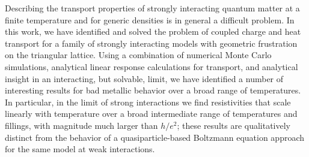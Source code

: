 \documentclass[aps,prx,onecolumn,amsmath,nofootinbib,amssymb,11pt]{revtex4-1}
\begin{document}
{Describing the transport properties of strongly interacting quantum matter at a finite temperature and for generic densities is in general a difficult problem. In this work, we have identified and solved the problem of coupled charge and heat transport for a family of strongly interacting models with geometric frustration on the triangular lattice. Using a combination of numerical Monte Carlo simulations, analytical linear response calculations for transport, and analytical insight in an interacting, but solvable, limit, we have identified a number of interesting results for bad metallic behavior over a broad range of temperatures. In particular, in the limit of strong interactions we find resistivities that scale linearly with temperature over a broad intermediate range of temperatures and fillings, with magnitude much larger than $h/e^2$; these results are qualitatively distinct from the behavior of a quasiparticle-based Boltzmann equation approach for the same model at weak interactions.  

}
\end{document}
